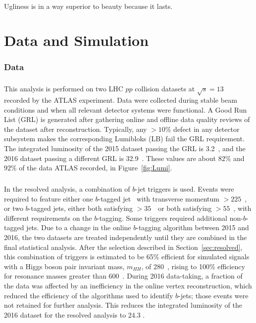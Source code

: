 \begin{savequote}[75mm]
Ugliness is in a way superior to beauty because it lasts.
\end{savequote}
\chapter{Data and Simulation}
%

\subsection{Data}

\paragraph{}
This analysis is performed on two LHC $pp$ collision datasets at $\sqrt{s} = 13$~\TeV~ recorded by the ATLAS experiment. Data were collected during stable beam conditions and when all relevant detector systems were functional. A Good Run List (GRL) is generated after gathering online and offline data quality reviews of the dataset after reconstruction. Typically, any $> 10\%$ defect in any detector subsystem makes the corresponding Lumibloks (LB) fail the GRL requirement. The integrated luminosity of the 2015 dataset passing the GRL is 3.2~\ifb, and the 2016 dataset passing a different GRL is 32.9~\ifb. These values are about $82\%$ and $92\%$ of the data ATLAS recorded, in Figure~\ref{fig:Lumi}.


\paragraph{}
In the resolved analysis, a combination of $b$-jet triggers is used. Events were required to feature either one $b$-tagged jet~\cite{btaggingRun2, Aad:2015ydr} with transverse momentum \pt$>225$~\GeV, or two $b$-tagged jets, either both satisfying \pt$>35$~\GeV\ or both satisfying \pt$>55$~\GeV, with different requirements on the $b$-tagging. Some triggers required additional non-$b$-tagged jets. Due to a change in the online $b$-tagging algorithm between 2015 and 2016, the two datasets are treated independently until they are combined in the final statistical analysis. After the selection described in Section~\ref{sec:resolved}, this combination of triggers is estimated to be 65\% efficient for simulated signals with a Higgs boson pair invariant mass, $m_{HH}$, of 280~\GeV, rising to 100\% efficiency for resonance masses greater than 600~\GeV. During 2016 data-taking, a fraction of the data was affected by an inefficiency in the online vertex reconstruction, which reduced the efficiency of the algorithms used to identify $b$-jets; those events were not retained for further analysis. This reduces the integrated luminosity of the 2016 dataset for the resolved analysis to 24.3 \ifb.

